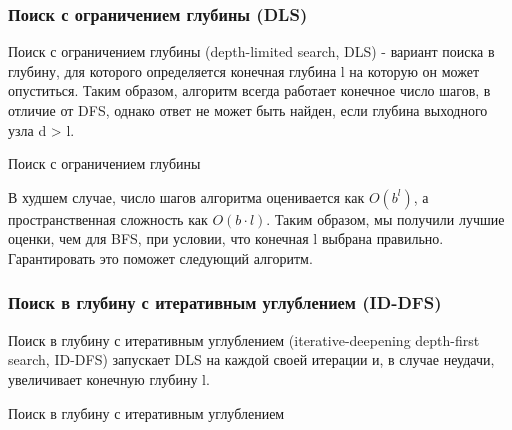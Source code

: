 \subsubsection{Поиск с ограничением глубины (DLS)} \label{DLS-algo}

Поиск с ограничением глубины (depth-limited search, DLS) - вариант поиска в глубину, для которого определяется конечная глубина l на которую он может опуститься. Таким образом, алгоритм всегда работает конечное число шагов, в отличие от DFS, однако ответ не может быть найден, если глубина выходного узла d > l.

\begin{algorithm}[H]
\SetAlgoLined
{}

\caption{Поиск с ограничением глубины} 
\label{algo:DLS}
\end{algorithm}

В худшем случае, число шагов алгоритма оценивается как $O(b^l)$, а пространственная сложность как $O(b \cdot l)$. Таким образом, мы получили лучшие оценки, чем для BFS, при условии, что конечная l выбрана правильно. Гарантировать это поможет следующий алгоритм.

\subsubsection{Поиск в глубину с итеративным углублением (ID-DFS)} \label{ID-DFS-algo}

Поиск в глубину с итеративным углублением (iterative-deepening depth-first search, ID-DFS) запускает DLS на каждой своей итерации и, в случае неудачи, увеличивает конечную глубину l.

\begin{algorithm}[H]
\SetAlgoLined
{}

\caption{Поиск в глубину с итеративным углублением}
\label{algo:ID-DFS}
\end{algorithm}


